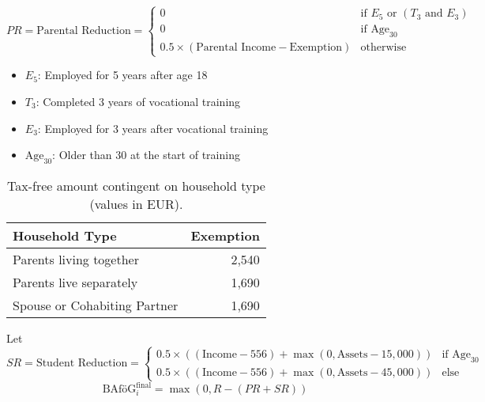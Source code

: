 \begin{equation} \label{eq:parental-reduction}
  PR = \text{Parental Reduction} = 
  \begin{cases}
    0 & \text{if } E_5 \text{ or } (T_3 \text{ and } E_3) \\
    0 & \text{if } \text{Age}_{30} \\
    0.5 \times (\text{Parental Income} - \text{Exemption}) & \text{otherwise}
  \end{cases}
\end{equation}

\begin{itemize}
  \item \( E_5 \): Employed for 5 years after age 18
  \item \( T_3 \): Completed 3 years of vocational training
  \item \( E_3 \): Employed for 3 years after vocational training
  \item \( \text{Age}_{30} \): Older than 30 at the start of training
\end{itemize}

\begin{table}[H]
\small
\centering
  \begin{tabular}{lr}
  \hline
  Household Type & Exemption \\
  \hline
  Parents living together & 2,540 \\
  Parents live separately & 1,690 \\
  Spouse or Cohabiting Partner & 1,690 \\
  \hline
  \end{tabular}
\caption{Tax-free amount contingent on household type (values in EUR).} 
\end{table}

Let 
\[
SR = \text{Student Reduction} = 
\begin{cases} 
    0.5 \times \left( (\text{Income} - 556) + \max(0, \text{Assets} - 15,000)  \right) & \text{if Age}_{30} \\
    0.5 \times \left( (\text{Income} - 556) + \max(0, \text{Assets} - 45,000) \right) & \text{else}
\end{cases}
\]
\[
\text{BAföG}^\text{final}_{i} = \max(0, R - (PR + SR)) %
\]


